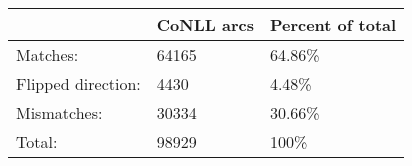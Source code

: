 	\begin{tabular}{|l|l|l|}
		\hline
		 & CoNLL arcs & Percent of total \\ 
		\hline
		Matches: & 64165 & 64.86\%\\ 
		\hline
		Flipped direction: & 4430 & 4.48\%\\ 
		\hline
		Mismatches: & 30334 & 30.66\%\\ 
		\hline
		Total: & 98929 & 100\% \\ 
		\hline
	\end{tabular}
